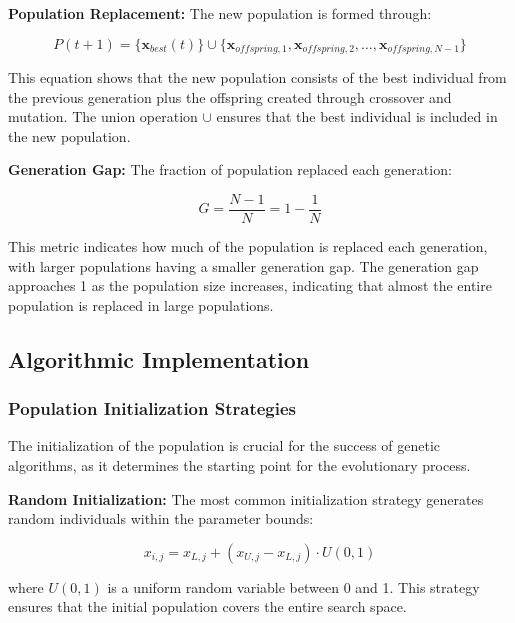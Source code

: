 \documentclass[12pt,a4paper]{article}
\begin{document}
\textbf{Population Replacement:} The new population is formed through:

\begin{equation}\label{Eq.population_replacement}
P(t+1) = \{\mathbf{x}_{best}(t)\} \cup \{\mathbf{x}_{offspring,1}, \mathbf{x}_{offspring,2}, \ldots, \mathbf{x}_{offspring,N-1}\}
\end{equation}

This equation shows that the new population consists of the best individual from the previous generation plus the offspring created through crossover and mutation. The union operation $\cup$ ensures that the best individual is included in the new population.

\textbf{Generation Gap:} The fraction of population replaced each generation:

\begin{equation}\label{Eq.generation_gap}
G = \frac{N-1}{N} = 1 - \frac{1}{N}
\end{equation}

This metric indicates how much of the population is replaced each generation, with larger populations having a smaller generation gap. The generation gap approaches 1 as the population size increases, indicating that almost the entire population is replaced in large populations.

\subsection{Algorithmic Implementation}

\subsubsection{Population Initialization Strategies}

The initialization of the population is crucial for the success of genetic algorithms, as it determines the starting point for the evolutionary process.

\textbf{Random Initialization:} The most common initialization strategy generates random individuals within the parameter bounds:

\begin{equation}\label{Eq.random_initialization}
x_{i,j} = x_{L,j} + (x_{U,j} - x_{L,j}) \cdot U(0,1)
\end{equation}

where $U(0,1)$ is a uniform random variable between 0 and 1. This strategy ensures that the initial population covers the entire search space.
\end{document}
